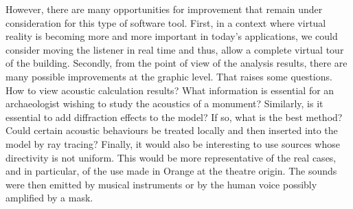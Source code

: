 \documentclass[AMA,STIX1COL]{WileyNJD-v2}
\begin{document}
However, there are many opportunities for improvement that remain under consideration for this type of software tool. First, in a context where virtual reality is becoming more and more important in today's applications, we could consider moving the listener in real time and thus, allow a complete virtual tour of the building. Secondly, from the point of view of the analysis results, there are many possible improvements at the graphic level. That raises some questions. How to view acoustic calculation results? What information is essential for an archaeologist wishing to study the acoustics of a monument? Similarly, is it essential to add diffraction effects to the model? If so, what is the best method? Could certain acoustic behaviours be treated locally and then inserted into the model by ray tracing? Finally, it would also be interesting to use sources whose directivity is not uniform. This would be more representative of the real cases, and in particular, of the use made in Orange at the theatre origin. The sounds were then emitted by musical instruments or by the human voice possibly amplified by a mask.
\end{document}
